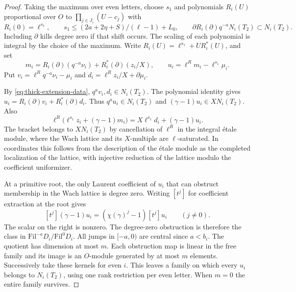 \begin{proof}
Taking the maximum
over even letters, choose \(s_1\) and polynomials \(R_i(U)\)
proportional over \(O\) to \(\prod_{j\in J_i}(U-c_j)\) with
\[
 R_i(0)=\ell^{s_1},\qquad
 s_1\le(2a+2\eta+S)/(\ell-1)+L_0,\qquad
 \partial R_i(\partial)q^{-a}N_i(T_2)\subset N_i(T_2).
\]
Including \(\partial\) kills degree zero if that shift occurs.
The scaling of each polynomial is integral by the choice of the
maximum. Write \(R_i(U)=\ell^{s_1}+U R_i^*(U)\), and set
\[
 m_i=R_i(\partial)(q^{-a}\nu_i)+R_i^*(\partial)(z_i/X),
 \qquad u_i=\ell^R m_i-\ell^{s_1}\mu_i .
\]
Put \(v_i=\ell^R q^{-a}\nu_i-\mu_i\) and
\(d_i=\ell^R z_i/X+\partial\mu_i\).

By \eqref{eq:thick-extension-data},
\(q^a v_i,d_i\in N_i(T_2)\). The polynomial identity gives
\(u_i=R_i(\partial)v_i+R_i^*(\partial)d_i\). Thus
\(q^a u_i\in N_i(T_2)\) and \((\gamma-1)u_i\in XN_i(T_2)\).
Also
\[
 \ell^R\bigl(\ell^{s_1}z_i+(\gamma-1)m_i\bigr)
       =X\ell^{s_1}d_i+(\gamma-1)u_i .
\]
The bracket belongs to \(XN_i(T_2)\) by cancellation
of \(\ell^R\) in the integral \'etale module, where the Wach
lattice and its \(X\)-multiple are \(\ell\)-saturated. In coordinates this follows from the
description of the \'etale module as the completed localization
of the lattice, with injective reduction of the lattice modulo
the coefficient uniformizer.

At a primitive root, the only Laurent coefficient of \(u_i\)
that can obstruct membership in the Wach lattice is degree zero.
Writing \([t^j]\) for coefficient extraction at the root gives
\[
 [t^j](\gamma-1)u_i=(\chi(\gamma)^j-1)[t^j]u_i\qquad(j\ne0).
\]
The scalar on the right is nonzero. The degree-zero obstruction is therefore
the class in \(\mathrm{Fil}^{-a}D_i/\mathrm{Fil}^{0}D_i\).
All jumps in \([-a,0)\) are central since \(a<b_i\).
The quotient has dimension at most \(m\). Each obstruction
map is linear in the free family and its image is an
\(O\)-module generated by at most \(m\) elements.
Successively take these kernels for even \(i\). This leaves
a family on which every \(u_i\) belongs to \(N_i(T_2)\), using
one rank restriction per even letter. When \(m=0\) the entire
family survives.
\end{proof}
